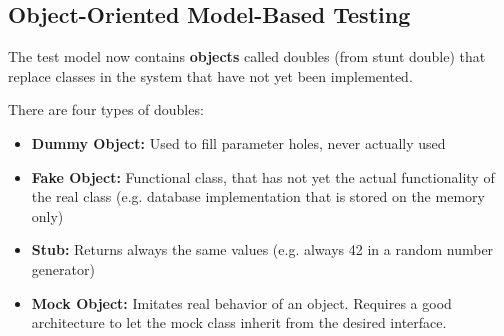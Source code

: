 \subsection{Object-Oriented Model-Based Testing}
The test model now contains \textbf{objects} called doubles (from stunt double) that replace classes in the system that have not yet been implemented.

There are four types of doubles:
\begin{itemize}[topsep=3pt]
  \item \textbf{Dummy Object:} Used to fill parameter holes, never actually used
  \item \textbf{Fake Object:} Functional class, that has not yet the actual functionality of the real class (e.g. database implementation that is stored on the memory only)
  \item \textbf{Stub:} Returns always the same values (e.g. always 42 in a random number generator)
  \item \textbf{Mock Object:} Imitates real behavior of an object. Requires a good architecture to let the mock class inherit from the desired interface.
\end{itemize}
\newpage

